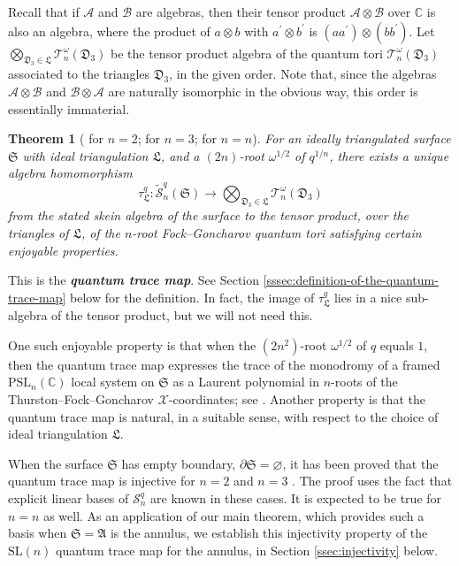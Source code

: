 \documentclass[12pt,
	]{amsart}
\newtheorem{theorem}{Theorem}[section]
\theoremstyle{definition}
\renewcommand{\tilde}{\widetilde}
\renewcommand{\emptyset}{\varnothing}
\newcommand{\mrm}[1]{\mathrm{#1}}
\newcommand{\mbb}[1]{\mathbb{#1}}
\newcommand{\mcal}[1]{\mathcal{#1}}
\newcommand{\mfrak}[1]{\mathfrak{#1}}
\newcommand{\define}[1]{{\textit{\textbf{#1}}}}
\newcommand{\C}{\mbb{C}}
\newcommand{\nsl}{\mrm{SL}(n)}
\newcommand{\sk}{\mcal{S}_n^q}
\newcommand{\ann}{\mfrak{A}}
\newcommand{\surf}{\mfrak{S}}
\newcommand{\qroot}{q^{1/n}}
\newcommand{\ssk}{\tilde{\mcal{S}}_n^q}
\newcommand{\ttriang}{\mfrak{D}_3}
\newcommand{\idealtriang}{\mfrak{L}}
\newcommand{\wroot}{\omega}
\newcommand{\qtorus}[1]{\mcal{T}_n^\wroot(#1)}
\newcommand{\qtr}{\tau^q_\idealtriang}
\begin{document}
Recall that if $\mcal{A}$ and $\mcal{B}$ are algebras, then their tensor product $\mcal{A}\otimes\mcal{B}$ over $\C$ is also an algebra, where the product of $a\otimes b$ with $a^\prime\otimes b^\prime$ is $(aa^\prime)\otimes(bb^\prime)$.  Let $\bigotimes_{\ttriang\in\idealtriang}\qtorus{\ttriang}$ be the tensor product algebra of the quantum tori $\qtorus{\ttriang}$ associated to the triangles $\ttriang$, in the given order.  Note that, since the algebras $\mcal{A}\otimes\mcal{B}$ and $\mcal{B}\otimes\mcal{A}$ are naturally isomorphic in the obvious way, this order is essentially immaterial.   

\begin{theorem}[\cite{bonahonMR2851072} for $n=2$; \cite{douglasMR4717274, kim2022rm} for $n=3$; \cite{le2023quantum} for $n=n$]
For an ideally triangulated surface $\surf$ with ideal triangulation $\idealtriang$, and a $(2n)$-root $\wroot^{1/2}$ of $\qroot$, there exists a unique algebra homomorphism
\begin{equation*}
\qtr:\ssk(\surf)\to\bigotimes_{\ttriang\in\idealtriang}\qtorus{\ttriang}
\end{equation*}
from the stated skein algebra of the surface to the tensor product, over the triangles of $\idealtriang$, of the $n$-root Fock--Goncharov quantum tori satisfying certain enjoyable properties.  
\end{theorem}

This is the \define{quantum trace map}.  See Section \ref{sssec:definition-of-the-quantum-trace-map} below for the definition.  In fact, the image of $\qtr$ lies in a nice sub-algebra of the tensor product, but we will not need this.

One such enjoyable property is that when the $(2n^2)$-root $\wroot^{1/2}$ of $q$ equals $1$, then the quantum trace map expresses the trace of the monodromy of a framed $\mrm{PSL}_n(\C)$ local system on $\surf$ as a Laurent polynomial in $n$-roots of the Thurston--Fock--Goncharov $\mcal{X}$-coordinates; see \cite{bonahonMR2851072, douglasMR4717274}.  Another property is that the quantum trace map is natural, in a suitable sense, with respect to the choice of ideal triangulation $\idealtriang$.  

When the surface $\surf$ has empty boundary, $\partial\surf=\emptyset$, it has been proved that the quantum trace map is injective for $n=2$ \cite{bonahonMR2851072} and $n=3$ \cite{kim2022rm}.  The proof uses the fact that explicit linear bases of $\sk$ are known in these cases.  It is expected to be true for $n=n$ as well.  As an application of our main theorem, which provides such a basis when $\surf=\ann$ is the annulus, we establish this injectivity property of the $\nsl$ quantum trace map for the annulus, in Section \ref{ssec:injectivity} below.  
\end{document}
